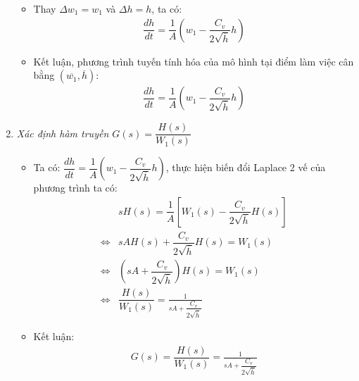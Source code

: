\begin{enumerate}[\it a.]
\begin{itemize}
                \item Thay $\Delta w_1 = w_1$ và $\Delta h = h$, ta có:
                    \begin{align}
                        \dfrac{dh}{dt} = \dfrac{1}{A} \left({w_1 - \dfrac{C_v}{2 \sqrt{\overline{h}}} h}\right)
                    \end{align}

                \item Kết luận, phương trình tuyến tính hóa của mô hình tại điểm làm việc cân bằng $\left({\overline{w_1}, \overline{h}}\right)$:
                    \begin{align}
                        \dfrac{dh}{dt} = \dfrac{1}{A} \left({w_1 - \dfrac{C_v}{2 \sqrt{\overline{h}}} h}\right)
                    \end{align}
            \end{itemize}

        \item \textit{Xác định hàm truyền $G(s) = \dfrac{H(s)}{W_1(s)}$}
            \begin{itemize}
                \item Ta có: $\dfrac{dh}{dt} = \dfrac{1}{A} \left({w_1 - \dfrac{C_v}{2 \sqrt{\overline{h}}} h}\right)$, thực hiện biến đổi Laplace 2 vế của phương trình ta có:
                    \begin{align}
                        & s H(s) = \dfrac{1}{A} \left[{W_1(s) - \dfrac{C_v}{2 \sqrt{\overline{h}}} H(s)}\right]\\
                        \Longleftrightarrow & s A H(s) + \dfrac{C_v}{2 \sqrt{\overline{h}}} H(s) = W_1(s)\\
                        \Longleftrightarrow & \left({s A + \dfrac{C_v}{2 \sqrt{\overline{h}}}}\right) H(s) = W_1(s) \\
                        \Longleftrightarrow & \dfrac{H(s)}{W_1(s)} = \frac{1}{s A + \dfrac{C_v}{2 \sqrt{\overline{h}}}}
                    \end{align}

                \item Kết luận:
                    \begin{align}
                        G(s) = \dfrac{H(s)}{W_1(s)} = \frac{1}{s A + \dfrac{C_v}{2 \sqrt{\overline{h}}}}
                    \end{align}
            \end{itemize}
    \end{enumerate}
